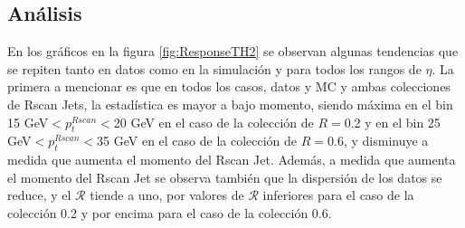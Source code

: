 \subsection{Análisis}
En los gráficos en la figura \ref{fig:ResponseTH2} se observan algunas tendencias que se repiten tanto en datos como en la simulación y para todos los rangos de $\eta$. La primera a mencionar es que en todos los casos, datos y MC y ambas colecciones de Rscan Jets, la estadística es mayor a bajo momento, siendo máxima en el bin 15 GeV$<p_t^{Rscan}<$20 GeV en el caso de la colección de $R=$0.2 y en el bin  25 GeV$<p_t^{Rscan}<$35 GeV en el caso de la colección de $R=$0.6, y disminuye a medida que aumenta el momento del Rscan Jet. Además, a medida que aumenta el momento del Rscan Jet se observa también que la dispersión de los datos se reduce, y el $\mathcal{R}$ tiende a uno, por valores de $\mathcal{R}$ inferiores para el caso de la colección 0.2 y por encima para el caso de la colección 0.6.
